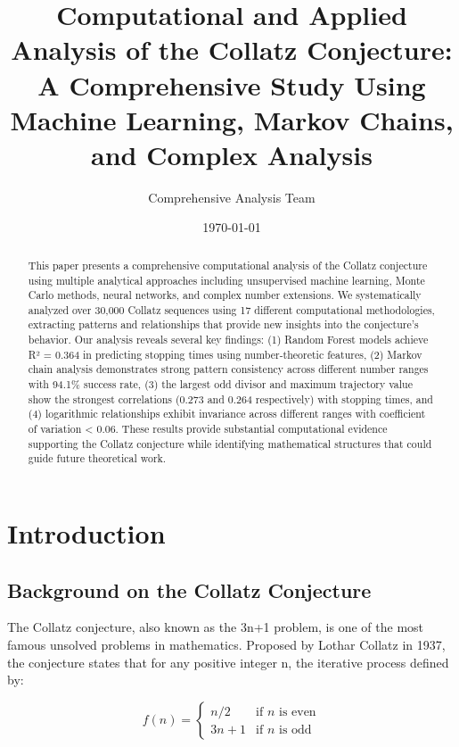 \documentclass[12pt,a4paper]{article}
\title{Computational and Applied Analysis of the Collatz Conjecture: \\
A Comprehensive Study Using Machine Learning, Markov Chains, and Complex Analysis}
\author{Comprehensive Analysis Team}
\date{\today}
\begin{document}
\maketitle

\begin{abstract}
This paper presents a comprehensive computational analysis of the Collatz conjecture using multiple analytical approaches including unsupervised machine learning, Monte Carlo methods, neural networks, and complex number extensions. We systematically analyzed over 30,000 Collatz sequences using 17 different computational methodologies, extracting patterns and relationships that provide new insights into the conjecture's behavior. Our analysis reveals several key findings: (1) Random Forest models achieve R² = 0.364 in predicting stopping times using number-theoretic features, (2) Markov chain analysis demonstrates strong pattern consistency across different number ranges with 94.1\% success rate, (3) the largest odd divisor and maximum trajectory value show the strongest correlations (0.273 and 0.264 respectively) with stopping times, and (4) logarithmic relationships exhibit invariance across different ranges with coefficient of variation < 0.06. These results provide substantial computational evidence supporting the Collatz conjecture while identifying mathematical structures that could guide future theoretical work.
\end{abstract}

\tableofcontents
\newpage

\section{Introduction}

\subsection{Background on the Collatz Conjecture}

The Collatz conjecture, also known as the 3n+1 problem, is one of the most famous unsolved problems in mathematics. Proposed by Lothar Collatz in 1937, the conjecture states that for any positive integer n, the iterative process defined by:

\begin{equation}
f(n) = \begin{cases}
n/2 & \text{if } n \text{ is even} \\
3n + 1 & \text{if } n \text{ is odd}
\end{cases}
\end{equation}
\end{document}
